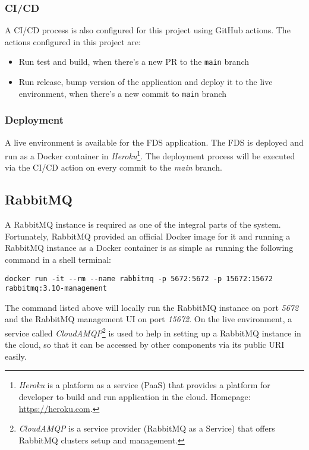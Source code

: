   \subsubsection{CI/CD}
  A CI/CD process is also configured for this project using GitHub actions. The actions configured in this project are:

   \begin{itemize}
    \item Run test and build, when there's a new PR to the \verb;main; branch
    \item Run release, bump version of the application and deploy it to the live environment, when there's a new commit to \verb;main; branch
   \end{itemize}
   
  \subsubsection{Deployment}
  A live environment is available for the FDS application. The FDS is deployed and run as a Docker container in \emph{Heroku}\footnote{\emph{Heroku} is a platform as a service (PaaS) that provides a platform for developer to build and run application in the cloud. Homepage: \url{https://heroku.com}.}. The deployment process will be executed via the CI/CD action on every commit to the \emph{main} branch. 

 \subsection{RabbitMQ}
 A RabbitMQ instance is required as one of the integral parts of the system. Fortunately, RabbitMQ provided an official Docker image for it and running a RabbitMQ instance as a Docker container is as simple as running the following command in a shell terminal:

 \begin{lstlisting}[caption={Running a RabbitMQ instance with Docker (Shell)}]
 docker run -it --rm --name rabbitmq -p 5672:5672 -p 15672:15672 rabbitmq:3.10-management 
 \end{lstlisting}

 The command listed above will locally run the RabbitMQ instance on port \emph{5672} and the RabbitMQ management UI on port \emph{15672}. On the live environment, a service called \emph{CloudAMQP}\footnote{\emph{CloudAMQP} is a service provider (RabbitMQ as a Service) that offers RabbitMQ clusters setup and management.} is used to help in setting up a RabbitMQ instance in the cloud, so that it can be accessed by other components via its public URI easily.

